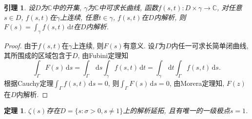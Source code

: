 \documentclass[12pt, a4paper, oneside]{ctexart}
\newtheorem{theorem}{定理}[section] %
\newtheorem{lemma}{引理}[section]
\numberwithin{equation}{section}  %
\def\C{\mathbb{C}}          %
\def\d{\mathrm{d}}          %
\begin{document}
\begin{lemma}\label{le-int3}
    设$D$为$\C$中的开集, $\gamma$为$\C$中可求长曲线, 函数$f(s, t):D\times \gamma\to \C$, 对任意$s\in D$, $f(s, t)$在$\gamma$上连续, 任意$t\in \gamma$, $f(s, t)$在$D$内解析, 则$F(s) = \int_{\gamma}f(s, t)\,\d t$在$D$内解析.
\end{lemma}
\begin{proof}
    由于$f(s, t)$在$\gamma$上连续, 则$F(s)$有意义. 设$\Gamma$为$D$内任一可求长简单闭曲线, 其所围成的区域包含于$D$, 由Fubini定理知
    \begin{equation*}
        \int_{\Gamma}F(s)\,\d s=\int_{\Gamma}\,\d s\int_{\gamma}f(s, t)\,\d t = \int_{\gamma}\,\d t\int_{\Gamma}f(s, t)\,\d s.
    \end{equation*}
    根据Cauchy定理$\int_{\Gamma}f(s, t)\,\d s = 0$, 则$\int_{\Gamma}F(s)\,\d s = 0$, 由Morera定理知, $F(z)$在$D$内解析.
\end{proof}
\begin{theorem}\label{thm-zeta}
    $\zeta(s)$存在$D=\{s:\sigma > 0, s\neq 1\}$上的解析延拓, 且有唯一的一级极点$s = 1$.
\end{theorem}
\end{document}
